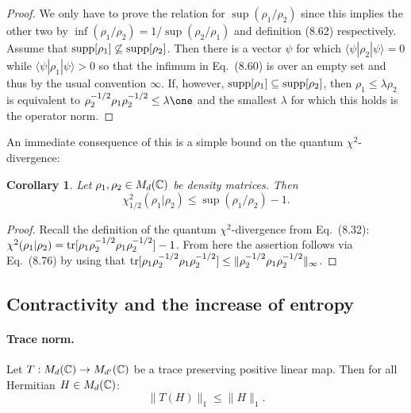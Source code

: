 \documentclass[11pt,a4paper]{article}
\theoremstyle{plain}
\newtheorem{corollary}{Corollary}[section]
\theoremstyle{definition}
\theoremstyle{remark}
\begin{document}
\begin{proof}
    We only have to prove the relation for $\sup(\rho_1/\rho_2)$ since this implies the other two by $\inf(\rho_1/\rho_2)=1/\sup(\rho_2/\rho_1)$ and definition (8.62) respectively.
    Assume that $\operatorname{supp}[\rho_1]\not\subseteq \operatorname{supp}[\rho_2]$. Then there is a vector $\psi$ for which $\langle\psi|\rho_2|\psi\rangle=0$ while $\langle\psi|\rho_1|\psi\rangle>0$ so that the infimum in Eq.~(8.60) is over an empty set and thus by the usual convention $\infty$.
    If, however, $\operatorname{supp}[\rho_1]\subseteq\operatorname{supp}[\rho_2]$, then $\rho_1\le \lambda \rho_2$ is equivalent to $\rho_2^{-1/2}\rho_1\rho_2^{-1/2}\le \lambda\one$ and the smallest $\lambda$ for which this holds is the operator norm.
\end{proof}

An immediate consequence of this is a simple bound on the quantum $\chi^2$-divergence:

\begin{corollary}
    Let $\rho_1,\rho_2\in M_d(\mathbb{C})$ be density matrices. Then
    \begin{equation}\tag{8.78}
        \chi^2_{1/2}(\rho_1|\rho_2) \le \sup(\rho_1/\rho_2) - 1.
    \end{equation}
\end{corollary}

\begin{proof}
    Recall the definition of the quantum $\chi^2$-divergence from Eq.~(8.32):
    $\chi^2(\rho_1|\rho_2)=\operatorname{tr}[\rho_1\rho_2^{-1/2}\rho_1\rho_2^{-1/2}]-1$.
    From here the assertion follows via Eq.~(8.76) by using that
    $\operatorname{tr}[\rho_1\rho_2^{-1/2}\rho_1\rho_2^{-1/2}] \le \|\rho_2^{-1/2}\rho_1\rho_2^{-1/2}\|_\infty$.
\end{proof}

\subsection{Contractivity and the increase of entropy}

\paragraph{Trace norm.}

\begin{theorem}
    Let $T:M_d(\mathbb{C})\to M_{d'}(\mathbb{C})$ be a trace preserving positive linear map. Then for all Hermitian $H\in M_d(\mathbb{C})$:
    \begin{equation}\tag{8.79}
        \|T(H)\|_1 \le \|H\|_1.
    \end{equation}
\end{theorem}
\end{document}
